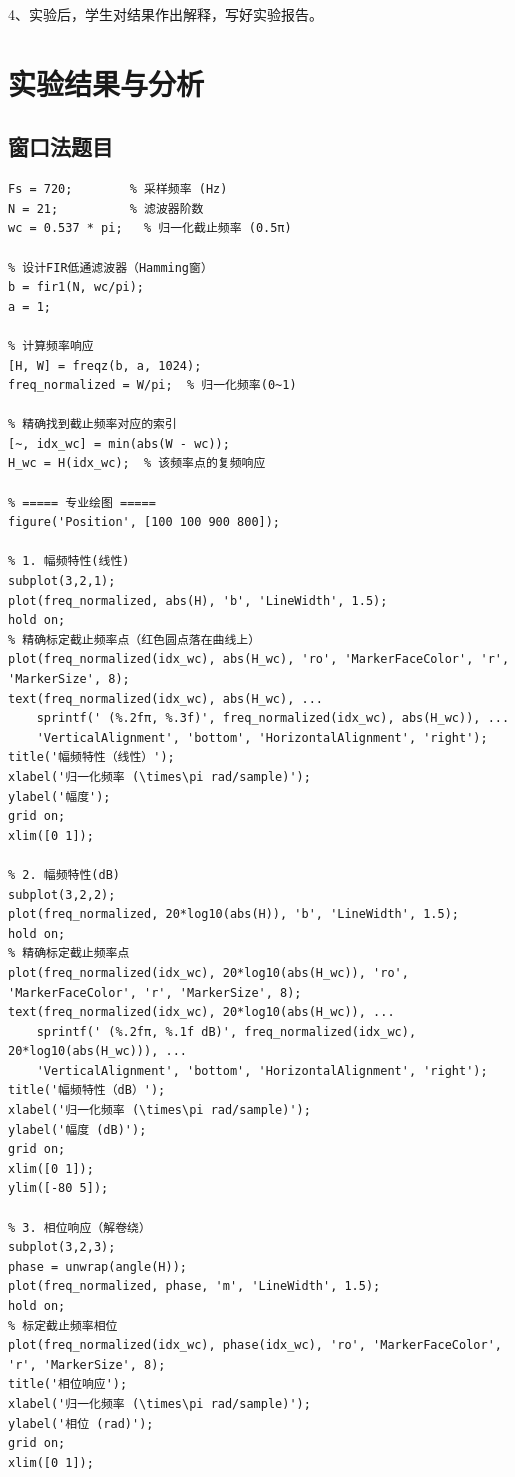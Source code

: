 \documentclass[12pt,hyperref,a4paper,UTF8]{ctexart}
\begin{document}
4、实验后，学生对结果作出解释，写好实验报告。

\section{实验结果与分析}

\subsection{窗口法题目}

\begin{lstlisting}[style=matlab, caption={实验一MATLAB实现代码}]
% 定义FIR低通滤波器的设计参数
Fs = 720;        % 采样频率 (Hz)
N = 21;          % 滤波器阶数
wc = 0.537 * pi;   % 归一化截止频率 (0.5π)

% 设计FIR低通滤波器（Hamming窗）
b = fir1(N, wc/pi);
a = 1;

% 计算频率响应
[H, W] = freqz(b, a, 1024);
freq_normalized = W/pi;  % 归一化频率(0~1)

% 精确找到截止频率对应的索引
[~, idx_wc] = min(abs(W - wc));
H_wc = H(idx_wc);  % 该频率点的复频响应

% ===== 专业绘图 =====
figure('Position', [100 100 900 800]);

% 1. 幅频特性(线性)
subplot(3,2,1);
plot(freq_normalized, abs(H), 'b', 'LineWidth', 1.5);
hold on;
% 精确标定截止频率点（红色圆点落在曲线上）
plot(freq_normalized(idx_wc), abs(H_wc), 'ro', 'MarkerFaceColor', 'r', 'MarkerSize', 8);
text(freq_normalized(idx_wc), abs(H_wc), ...
    sprintf(' (%.2fπ, %.3f)', freq_normalized(idx_wc), abs(H_wc)), ...
    'VerticalAlignment', 'bottom', 'HorizontalAlignment', 'right');
title('幅频特性（线性）');
xlabel('归一化频率 (\times\pi rad/sample)');
ylabel('幅度');
grid on;
xlim([0 1]);

% 2. 幅频特性(dB)
subplot(3,2,2);
plot(freq_normalized, 20*log10(abs(H)), 'b', 'LineWidth', 1.5);
hold on;
% 精确标定截止频率点
plot(freq_normalized(idx_wc), 20*log10(abs(H_wc)), 'ro', 'MarkerFaceColor', 'r', 'MarkerSize', 8);
text(freq_normalized(idx_wc), 20*log10(abs(H_wc)), ...
    sprintf(' (%.2fπ, %.1f dB)', freq_normalized(idx_wc), 20*log10(abs(H_wc))), ...
    'VerticalAlignment', 'bottom', 'HorizontalAlignment', 'right');
title('幅频特性（dB）');
xlabel('归一化频率 (\times\pi rad/sample)');
ylabel('幅度 (dB)');
grid on;
xlim([0 1]);
ylim([-80 5]);

% 3. 相位响应（解卷绕）
subplot(3,2,3);
phase = unwrap(angle(H));
plot(freq_normalized, phase, 'm', 'LineWidth', 1.5);
hold on;
% 标定截止频率相位
plot(freq_normalized(idx_wc), phase(idx_wc), 'ro', 'MarkerFaceColor', 'r', 'MarkerSize', 8);
title('相位响应');
xlabel('归一化频率 (\times\pi rad/sample)');
ylabel('相位 (rad)');
grid on;
xlim([0 1]);




\end{lstlisting}
\end{document}
